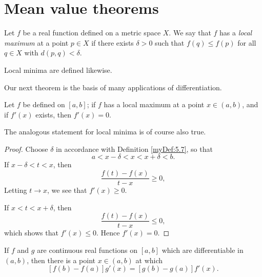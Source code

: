 \section{Mean value theorems}
\begin{myDef}
    \label{myDef:5.7}
    Let $f$ be a real function defined on a metric space $X$.
    We say that $f$ has a \emph{local maximum} at a point $p \in X$ 
    if there exists $\delta > 0$ 
    such that $f(q) \leq f(p)$ 
    for all $q \in X$ with $d(p, q) < \delta$.
\end{myDef}
Local minima are defined likewise.

Our next theorem is the basis of many applications of differentiation.
\begin{thm}
    \label{thm:5.8}
    Let $f$ be defined on $[a, b]$;
    if $f$ has a local maximum at a point $x \in (a, b)$, 
    and if $f'(x)$ exists, then $f'(x) = 0$.
\end{thm}

The analogous statement for local minima is of course also true.
\begin{proof}
    Choose $\delta$ in accordance with Definition \ref{myDef:5.7}, 
    so that
    \begin{equation*}
        a < x - \delta < x < x + \delta < b.
    \end{equation*}
    If $x - \delta < t < x$, then
    \begin{equation*}
        \frac{f(t)-f(x)}{t-x} \geq 0,
    \end{equation*}
    Letting $t \rightarrow x$, we see that $f'(x) \geq 0$.
    
    If $x < t < x + \delta$, then 
    \begin{equation*}
        \frac{f(t) -f(x)}{t-x} \leq 0,
    \end{equation*}
    which shows that $f'(x) \leq 0$. Hence $f'(x) = 0$.
\end{proof}

\begin{thm}
    \label{thm:5.9}
    If $f$ and $g$ are continuous real functions on $[a, b]$ 
    which are differentiable in $(a, b)$, 
    then there is a point $x \in (a, b)$ at which
    \begin{equation*}
        \left[ f(b) - f(a) \right]g'(x) = 
        \left[ g(b) - g(a) \right]f'(x).
    \end{equation*}
\end{thm}

